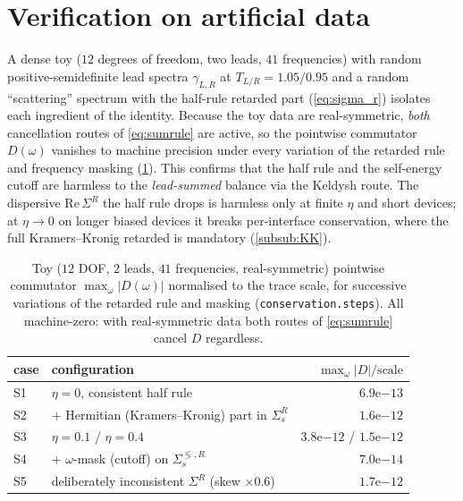\section{Verification on artificial data}
\label{sec:cons_toy}

A dense toy ($12$ degrees of freedom, two leads, $41$ frequencies) with random
positive-semidefinite lead spectra $\gamma_{L,R}$ at $T_{L/R}=1.05/0.95$ and a
random ``scattering'' spectrum with the half-rule retarded part
(\cref{eq:sigma_r}) isolates each ingredient of the identity. Because the toy
data are real-symmetric, \emph{both} cancellation routes of \cref{eq:sumrule}
are active, so the pointwise commutator $D(\omega)$ vanishes to machine
precision under every variation of the retarded rule and frequency masking
(\cref{tab:cons_toy}). This confirms that the half rule and the self-energy cutoff
are harmless to the \emph{lead-summed} balance via the Keldysh route. The dispersive
$\mathrm{Re}\,\Sigma^R$ the half rule drops is harmless only at finite $\eta$ and
short devices; at $\eta\to0$ on longer biased devices it breaks per-interface
conservation, where the full Kramers--Kronig retarded is mandatory
(\cref{subsub:KK}).

\begin{table}[t]
  \centering
  \caption{Toy ($12$ DOF, $2$ leads, $41$ frequencies, real-symmetric)
    pointwise commutator $\max_\omega|D(\omega)|$ normalised to the trace
    scale, for successive variations of the retarded rule and masking
    (\texttt{conservation.steps}). All machine-zero: with real-symmetric data
    both routes of \cref{eq:sumrule} cancel $D$ regardless.}
  \label{tab:cons_toy}
  \begin{tabular}{llr}
    \toprule
    case & configuration & $\max_\omega|D|/\text{scale}$\\
    \midrule
    S1 & $\eta=0$, consistent half rule                       & $6.9\mathrm{e}{-13}$\\
    S2 & $+$ Hermitian (Kramers--Kronig) part in $\Sigma_s^R$ & $1.6\mathrm{e}{-12}$\\
    S3 & $\eta=0.1$ / $\eta=0.4$                              & $3.8\mathrm{e}{-12}$ / $1.5\mathrm{e}{-12}$\\
    S4 & $+$ $\omega$-mask (cutoff) on $\Sigma_s^{\lessgtr,R}$ & $7.0\mathrm{e}{-14}$\\
    S5 & deliberately inconsistent $\Sigma^R$ (skew $\times0.6$) & $1.7\mathrm{e}{-12}$\\
    \bottomrule
  \end{tabular}
\end{table}

